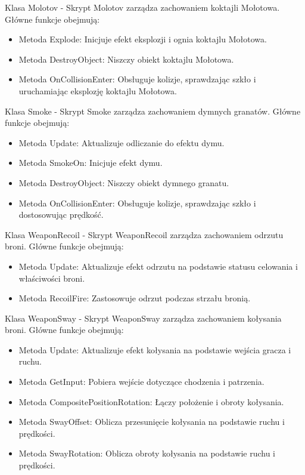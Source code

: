 Klasa Molotov -
Skrypt Molotov zarządza zachowaniem koktajli Mołotowa. Główne funkcje obejmują:
\begin{itemize}
  \item Metoda Explode: Inicjuje efekt eksplozji i ognia koktajlu Mołotowa.
  \item Metoda DestroyObject: Niszczy obiekt koktajlu Mołotowa.
  \item Metoda OnCollisionEnter: Obsługuje kolizje, sprawdzając szkło i uruchamiając eksplozję koktajlu Mołotowa.
\end{itemize}

Klasa Smoke -
Skrypt Smoke zarządza zachowaniem dymnych granatów. Główne funkcje obejmują:
\begin{itemize}
  \item Metoda Update: Aktualizuje odliczanie do efektu dymu.
  \item Metoda SmokeOn: Inicjuje efekt dymu.
  \item Metoda DestroyObject: Niszczy obiekt dymnego granatu.
  \item Metoda OnCollisionEnter: Obsługuje kolizje, sprawdzając szkło i dostosowując prędkość.
\end{itemize}

Klasa WeaponRecoil -
Skrypt WeaponRecoil zarządza zachowaniem odrzutu broni. Główne funkcje obejmują:
\begin{itemize}
  \item Metoda Update: Aktualizuje efekt odrzutu na podstawie statusu celowania i właściwości broni.
  \item Metoda RecoilFire: Zastosowuje odrzut podczas strzału bronią.
\end{itemize}

Klasa WeaponSway -
Skrypt WeaponSway zarządza zachowaniem kołysania broni. Główne funkcje obejmują:
\begin{itemize}
  \item Metoda Update: Aktualizuje efekt kołysania na podstawie wejścia gracza i ruchu.
  \item Metoda GetInput: Pobiera wejście dotyczące chodzenia i patrzenia.
  \item Metoda CompositePositionRotation: Łączy położenie i obroty kołysania.
  \item Metoda SwayOffset: Oblicza przesunięcie kołysania na podstawie ruchu i prędkości.
  \item Metoda SwayRotation: Oblicza obroty kołysania na podstawie ruchu i prędkości.
\end{itemize}

